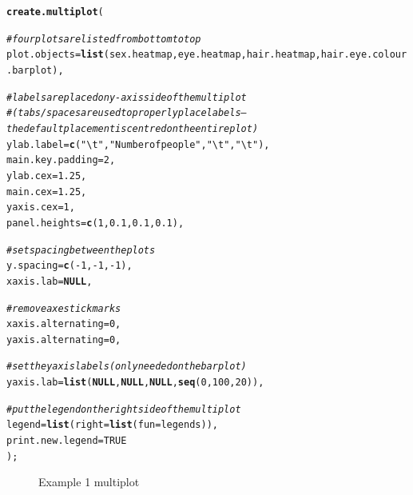 \documentclass[letterpaper]{report}\usepackage[]{graphicx}\usepackage[]{color}
\makeatletter
\newcommand{\hlnum}[1]{\textcolor[rgb]{0.686,0.059,0.569}{#1}}%
\newcommand{\hlstr}[1]{\textcolor[rgb]{0.192,0.494,0.8}{#1}}%
\newcommand{\hlcom}[1]{\textcolor[rgb]{0.678,0.584,0.686}{\textit{#1}}}%
\newcommand{\hlopt}[1]{\textcolor[rgb]{0,0,0}{#1}}%
\newcommand{\hlstd}[1]{\textcolor[rgb]{0.345,0.345,0.345}{#1}}%
\newcommand{\hlkwa}[1]{\textcolor[rgb]{0.161,0.373,0.58}{\textbf{#1}}}%
\newcommand{\hlkwc}[1]{\textcolor[rgb]{0.333,0.667,0.333}{#1}}%
\newcommand{\hlkwd}[1]{\textcolor[rgb]{0.737,0.353,0.396}{\textbf{#1}}}%
\newenvironment{kframe}{%
 \def\at@end@of@kframe{}%
 \ifinner\ifhmode%
  \def\at@end@of@kframe{\end{minipage}}%
  \begin{minipage}{\columnwidth}%
 \fi\fi%
 \def\FrameCommand##1{\hskip\@totalleftmargin \hskip-\fboxsep
 \colorbox{shadecolor}{##1}\hskip-\fboxsep
     \hskip-\linewidth \hskip-\@totalleftmargin \hskip\columnwidth}%
 \MakeFramed {\advance\hsize-\width
   \@totalleftmargin\z@ \linewidth\hsize
   \@setminipage}}%
 {\par\unskip\endMakeFramed%
 \at@end@of@kframe}
\newenvironment{knitrout}{}{} %
\makeatother
\begin{document}
\begin{knitrout}
\color{fgcolor}\begin{kframe}
\begin{alltt}
 \hlkwd{create.multiplot}\hlstd{(}

         \hlcom{# four plots are listed from bottom to top }
         \hlkwc{plot.objects} \hlstd{=} \hlkwd{list}\hlstd{(sex.heatmap, eye.heatmap, hair.heatmap, hair.eye.colour.barplot),}

         \hlcom{# labels are placed on y-axis side of the multiplot }
         \hlcom{# (tabs/spaces are used to properly place labels -- the default placement is centred on the entire plot)}
         \hlkwc{ylab.label} \hlstd{=} \hlkwd{c}\hlstd{(}\hlstr{"\textbackslash{}t"}\hlstd{,} \hlstr{"Number of people"}\hlstd{,} \hlstr{"\textbackslash{}t"}\hlstd{,} \hlstr{"\textbackslash{}t"}\hlstd{),}
         \hlkwc{main.key.padding} \hlstd{=} \hlnum{2}\hlstd{,}
         \hlkwc{ylab.cex} \hlstd{=} \hlnum{1.25}\hlstd{,}
         \hlkwc{main.cex} \hlstd{=} \hlnum{1.25}\hlstd{,}
         \hlkwc{yaxis.cex} \hlstd{=} \hlnum{1}\hlstd{,}
         \hlkwc{panel.heights} \hlstd{=} \hlkwd{c}\hlstd{(}\hlnum{1}\hlstd{,} \hlnum{0.1}\hlstd{,} \hlnum{0.1}\hlstd{,} \hlnum{0.1}\hlstd{),}

         \hlcom{# set spacing between the plots}
         \hlkwc{y.spacing} \hlstd{=} \hlkwd{c}\hlstd{(}\hlopt{-}\hlnum{1}\hlstd{,} \hlopt{-}\hlnum{1}\hlstd{,} \hlopt{-}\hlnum{1}\hlstd{),}
         \hlkwc{xaxis.lab} \hlstd{=} \hlkwa{NULL}\hlstd{,}

         \hlcom{# remove axes tick marks}
         \hlkwc{xaxis.alternating} \hlstd{=} \hlnum{0}\hlstd{,}
         \hlkwc{yaxis.alternating} \hlstd{=} \hlnum{0}\hlstd{,}

         \hlcom{# set the yaxis labels (only needed on the bar plot)}
         \hlkwc{yaxis.lab} \hlstd{=} \hlkwd{list}\hlstd{(}\hlkwa{NULL}\hlstd{,} \hlkwa{NULL}\hlstd{,} \hlkwa{NULL}\hlstd{,} \hlkwd{seq}\hlstd{(}\hlnum{0}\hlstd{,} \hlnum{100}\hlstd{,} \hlnum{20}\hlstd{)),}

         \hlcom{# put the legend on the right side of the multiplot}
         \hlkwc{legend} \hlstd{=} \hlkwd{list}\hlstd{(}\hlkwc{right} \hlstd{=} \hlkwd{list}\hlstd{(}\hlkwc{fun} \hlstd{= legends)),}
         \hlkwc{print.new.legend} \hlstd{=} \hlnum{TRUE}
         \hlstd{);}
\end{alltt}
\end{kframe}\begin{figure}

{\centering {} 

}

\caption[Example 1 multiplot]{Example 1 multiplot}\label{fig:multiplotex1_final}
\end{figure}


\end{knitrout}
\end{document}
